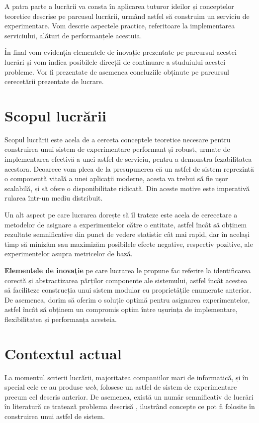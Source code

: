 A patra parte a lucrării va consta în aplicarea tuturor ideilor și conceptelor teoretice descrise pe parcusul lucrării, urmând astfel să construim un serviciu de experimentare. Vom descrie aspectele practice, referitoare la implementarea serviciului, alături de performanțele acestuia.

În final vom evidenția elementele de inovație prezentate pe parcursul acestei lucrări și vom indica posibilele direcții de continuare a studuiului acestei probleme. Vor fi prezentate de asemenea concluziile obținute pe parcursul cerecetării prezentate de lucrare.

\section{Scopul lucrării}

Scopul lucrării este acela de a cerceta conceptele teoretice necesare pentru construirea unui sistem de experimentare performant și robust, urmate de implementarea efectivă a unei astfel de serviciu, pentru a demonstra fezabilitatea acestora. Deoarece vom pleca de la presupunerea că un astfel de sistem reprezintă o componentă vitală a unei aplicații moderne, acesta va trebui să fie ușor scalabilă, și să ofere o disponibilitate ridicată. Din aceste motive este imperativă rularea într-un mediu distribuit.

Un alt aspect pe care lucrarea dorește să îl trateze este acela de cerecetare a metodelor de asignare a experimentelor către o entitate, astfel încât să obținem rezultate semnificative din punct de vedere statistic cât mai rapid, dar în același timp să minizăm sau maximizăm posibilele efecte negative, respectiv pozitive, ale experimentelor asupra metricelor de bază. 

\textbf{Elementele de inovație} pe care lucrarea le propune fac referire la identificarea corectă și abstractizarea părților componente ale sistemului, astfel încât acestea să faciliteze construcția unui sistem modular cu proprietățile enumerate anterior. De asemenea, dorim să oferim o soluție optimă pentru asignarea experimentelor, astfel încât să obținem un compromis optim între ușurința de implementare, flexibilitatea și  performanța acesteia.

\section{Contextul actual}

La momentul scrierii lucrării, majoritatea companiilor mari de informatică, și în special cele ce au produse \textit{web}, folosesc un astfel de sistem de experimentare precum cel descris anterior. De asemenea,  există un număr semnificativ de lucrări în literatură ce tratează problema descrisă \cite{overlapgoogle} \cite{multiarmeconomy}, ilustrând concepte ce pot fi folosite în construirea unui astfel de sistem. 

